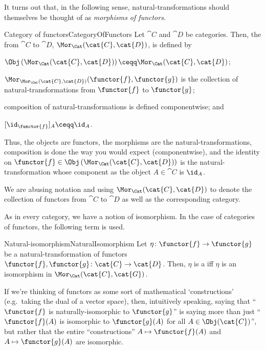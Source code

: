 It turns out that, in the following sense, natural-transformations should themselves be thought of as \emph{morphisms of functors}.
\begin{dfn}{Category of functors}{CategoryOfFunctors}
	Let $\cat{C}$ and $\cat{D}$ be categories.  Then, the  from $\cat{C}$ to $\cat{D}$, $\Mor _{\Cat}(\cat{C},\cat{D})$, is defined by
	\begin{data}
		\item $\Obj \left( \Mor _{\Cat}(\cat{C},\cat{D})\right) \ceqq \Mor _{\Cat}(\cat{C},\cat{D})$;
		\item $\Mor _{\Mor _{\Cat}(\cat{C},\cat{D})}(\functor{f},\functor{g})$ is the collection of natural-transformations from $\functor{f}$ to $\functor{g}$;
		\item composition of natural-transformations is defined componentwise; and
		\item $[\id _{\functor{f}}]_A\ceqq \id _A$.
	\end{data}
	\begin{rmk}
		Thus, the objects are functors, the morphisms are the natural-transformations, composition is done the way you would expect (componentwise), and the identity on $\functor{f}\in \Obj \left( \Mor _{\Cat}(\cat{C},\cat{D})\right)$ is the natural-transformation whose component as the object $A\in \cat{C}$ is $\id _A$.
	\end{rmk}
	\begin{rmk}
		We are abusing notation and using $\Mor _{\Cat}(\cat{C},\cat{D})$ to denote the collection of functors from $\cat{C}$ to $\cat{D}$ as well as the corresponding category.
	\end{rmk}
\end{dfn}
As in every category, we have a notion of isomorphism.  In the case of categories of functors, the following term is used.
\begin{dfn}{Natural-isomorphism}{NaturalIsomorphism}
	Let $\eta \colon \functor{f}\rightarrow \functor{g}$ be a natural-transformation of functors $\functor{f},\functor{g}\colon \cat{C}\rightarrow \cat{D}$.  Then, $\eta$ is a  iff $\eta$ is an isomorphism in $\Mor _{\Cat}(\cat{C},\cat{G})$.
	\begin{rmk}
		If we're thinking of functors as some sort of mathematical `constructions' (e.g.~taking the dual of a vector space), then, intuitively speaking, saying that ``$\functor{f}$ is naturally-isomorphic to $\functor{g}$'' is saying more than just ``$\functor{f}(A)$ is isomorphic to $\functor{g}(A)$ for all $A\in \Obj (\cat{C})$'', but rather that the entire ``constructions'' $A\mapsto \functor{f}(A)$ and $A\mapsto \functor{g}(A)$ are isomorphic.
	\end{rmk}
\end{dfn}
